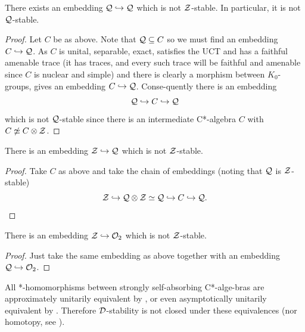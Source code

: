 \documentclass[12pt]{amsart}
\begin{document}
      \begin{cor}
        There exists an embedding $\mathcal{Q} \hookrightarrow \mathcal{Q}$ which is not $\mathcal{Z}$-stable. In particular, it is not $\mathcal{Q}$-stable.
          \begin{proof}
            Let $C$ be as above. Note that $\mathcal{Q} \subseteq C$ so we must find an embedding $C \hookrightarrow \mathcal{Q}$. As $C$ is unital, separable, exact, satisfies the UCT and has a faithful amenable trace (it has traces, and every such trace will be faithful and amenable since $C$ is nuclear and simple) and there is clearly a morphism between $K_0$-groups, \cite[Theorem D]{Schafhauser20} gives an embedding $C \hookrightarrow \mathcal{Q}$. Conse\hyp{}quently there is an embedding
\begin{equation}
            \mathcal{Q} \hookrightarrow C \hookrightarrow \mathcal{Q}
\end{equation}
            which is not $\mathcal{Q}$-stable since there is an intermediate C*-algebra $C$ with $C \not\simeq C \otimes \mathcal{Z}$. 
          \end{proof}
      \end{cor}

        \begin{cor}
          There is an embedding $\mathcal{Z} \hookrightarrow \mathcal{Q}$ which is not $\mathcal{Z}$-stable. 
            \begin{proof}
              Take $C$ as above and take the chain of embeddings (noting that $\mathcal{Q}$ is $\mathcal{Z}$-stable)
\begin{equation}
              \mathcal{Z} \hookrightarrow \mathcal{Q} \otimes \mathcal{Z} \simeq \mathcal{Q} \hookrightarrow C \hookrightarrow \mathcal{Q}.
\end{equation}
            \end{proof}
        \end{cor}

  \begin{cor}
    There is an embedding $\mathcal{Z} \hookrightarrow \mathcal{O}_2$ which is not $\mathcal{Z}$-stable. 
      \begin{proof}
        Just take the same embedding as above together with an embedding $\mathcal{Q} \hookrightarrow \mathcal{O}_2$. 
      \end{proof}
  \end{cor}

    \begin{remark}
      All *-homomorphisms between strongly self-absorbing C*-alge\hyp{}bras are approximately unitarily equivalent by \cite[Corollary 1.12]{TomsWinter07}, or even asymptotically unitarily equivalent by \cite[Theorem 2.2]{DadarlatWinter09}. Therefore $\mathcal{D}$-stability is not closed under these equivalences (nor homotopy, see \cite[Corollary 3.1]{DadarlatWinter09}).
    \end{remark} 
\end{document}
